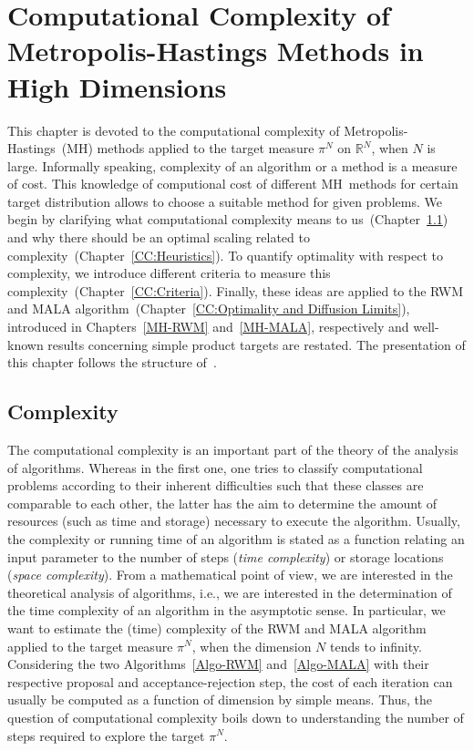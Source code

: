 \chapter[Computational Complexity]{Computational Complexity of Metropolis-Hastings Methods in High Dimensions}
\label{ch:Computational Complexity}

This chapter is devoted to the computational complexity of Metropolis-Hastings~(MH) methods applied to the target measure $ \pi^{N} $ on $ \mathbb{R}^{N} $, when $N$ is large. Informally speaking, complexity of an algorithm or a method is a measure of cost. This knowledge of computional cost of different MH~methods for certain target distribution allows to choose a suitable method for given problems. We begin by clarifying what computational complexity means to us~(Chapter~\ref{CC:Complexity}) and why there should be an optimal scaling related to complexity~(Chapter~\ref{CC:Heuristics}). To quantify optimality with respect to complexity, we introduce different criteria to measure this complexity~(Chapter~\ref{CC:Criteria}). Finally, these ideas are applied to the RWM and MALA algorithm~(Chapter~\ref{CC:Optimality and Diffusion Limits}), introduced in Chapters~\ref{MH-RWM} and~\ref{MH-MALA}, respectively and well-known results concerning simple product targets are restated. The presentation of this chapter follows the structure of~\autocite{Beskos2009, Roberts2001, Rosenthal2008}. 

\section{Complexity}
\label{CC:Complexity}

The computational complexity is an important part of the theory of the analysis of algorithms. Whereas in the first one, one tries to classify computational problems according to their inherent difficulties such that these classes are comparable to each other, the latter has the aim to determine the amount of resources (such as time and storage) necessary to execute the algorithm. Usually, the complexity or running time of an algorithm is stated as a function relating an input parameter to the number of steps (\textit{time complexity}) or storage locations (\textit{space complexity}). From a mathematical point of view, we are interested in the theoretical analysis of algorithms, i.e., we are interested in the determination of the time complexity of an algorithm in the asymptotic sense. In particular, we want to estimate the (time) complexity of the RWM and MALA algorithm applied to the target measure $ \pi^{N} $, when the dimension $N$ tends to infinity. Considering the two Algorithms~\ref{Algo-RWM} and~\ref{Algo-MALA} with their respective proposal and acceptance-rejection step, the cost of each iteration can usually be computed as a function of dimension by simple means. Thus, the question of computational complexity boils down to understanding the number of steps required to explore the target $ \pi^{N} $.


